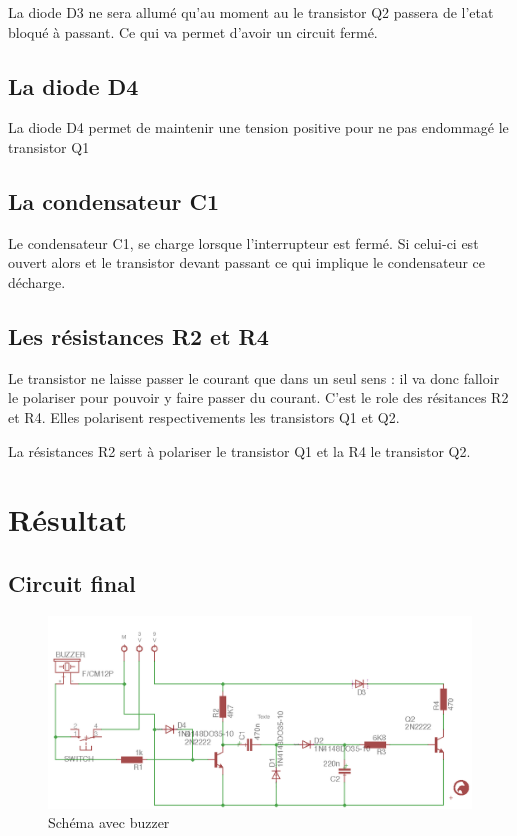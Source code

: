 La diode D3 ne sera allumé qu'au moment au le transistor Q2 passera de l'etat bloqué à passant. Ce qui va permet d'avoir un circuit fermé.

\section{La diode D4}

La diode D4 permet de maintenir une tension positive pour ne pas endommagé le transistor Q1

\section{La condensateur C1}

Le condensateur C1, se charge lorsque l'interrupteur est fermé. Si celui-ci est ouvert alors et le transistor devant passant ce qui implique le condensateur ce décharge.

\section{Les résistances R2 et R4}

Le transistor ne laisse passer le courant que dans un seul sens : il va donc falloir le polariser pour pouvoir y faire passer du courant. C'est le role des résitances R2 et R4. Elles polarisent respectivements les transistors Q1 et Q2.

La résistances R2 sert à polariser le transistor Q1 et la R4 le transistor Q2.

\chapter{Résultat}

\section{Circuit final}

\begin{figure}[H]
\centering
\includegraphics[width=1\textwidth]{ressources/schema_final}
\caption{Schéma avec buzzer}
\label{schemaEagle}
\end{figure}

